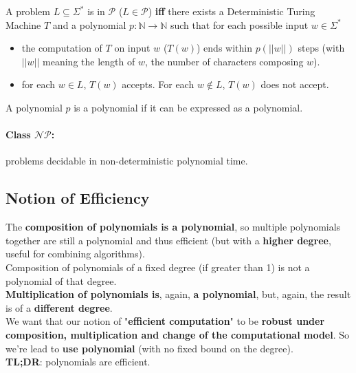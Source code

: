 \documentclass[11pt]{article}
\begin{document}
	A problem $L \subseteq \Sigma^\ast$ is in $\mathcal{P}$ ($L \in \mathcal{P}$) \textbf{iff} there exists a Deterministic Turing Machine $T$ and a polynomial $p: \mathbb{N} \rightarrow \mathbb{N}$ such that for each possible input $w \in \Sigma^\ast$ 
	\begin{itemize}
		\item the computation of $T$ on input $w$ ($T(w)$) ends within $p(||w||)$ steps (with $||w||$ meaning the length of $w$, the number of characters composing $w$).
		\item for each $w \in L$, $T(w)$ accepts. For each $w \notin L$, $T(w)$ does not accept.
	\end{itemize}
	
	A polynomial $p$ is a polynomial if it can be expressed as a polynomial.\\
	
	\paragraph{Class $\mathcal{NP}$:} problems decidable in non-deterministic polynomial time.\\
	
	\newpage
	
	\subsection*{Notion of Efficiency}
	
	The \textbf{composition of polynomials is a polynomial}, so multiple polynomials together are still a polynomial and thus efficient (but with a \textbf{higher degree}, useful for combining algorithms).\\
	Composition of polynomials of a fixed degree (if greater than 1) is not a polynomial of that degree.\\
	
	\textbf{Multiplication of polynomials is}, again, \textbf{a polynomial}, but, again, the result is of a \textbf{different degree}.\\
	
	We want that our notion of "\textbf{efficient computation}" to be \textbf{robust under composition, multiplication and change of the computational model}. So we're lead to \textbf{use polynomial} (with no fixed bound on the degree).\\
	
	\textbf{TL;DR}: polynomials are efficient.\\
	
\end{document}

